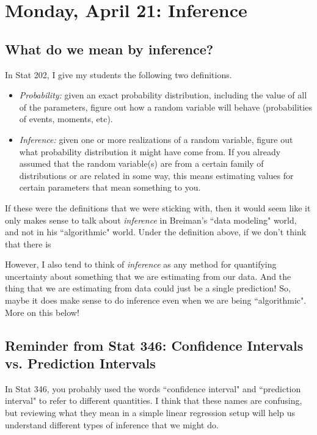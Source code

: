 \section{Monday, April 21: Inference}

\subsection{What do we mean by inference?}

In Stat 202, I give my students the following two definitions.
\begin{itemize}
\item \emph{Probability:} given an exact probability distribution, including the value of all of the parameters, figure out how a random variable will behave (probabilities of events, moments, etc).	
\item \emph{Inference:} given one or more realizations of a random variable, figure out what probability distribution it might have come from. If you already assumed that the random variable(s) are from a certain family of distributions or are related in some way, this means estimating values for certain parameters that mean something to you.  
\end{itemize}

If these were the definitions that we were sticking with, then it would seem like it only makes sense to talk about \emph{inference} in Breiman's ``data modeling" world, and not in his ``algorithmic" world. Under the definition above, if we don't think that there is 

However, I also tend to think of \emph{inference} as any method for quantifying uncertainty about something that we are estimating from our data. And the thing that we are estimating from data could just be a single prediction! So, maybe it does make sense to do inference even when we are being ``algorithmic". More on this below! 

\subsection{Reminder from Stat 346: Confidence Intervals vs. Prediction Intervals}

In Stat 346, you probably used the words ``confidence interval" and ``prediction interval" to refer to different quantities. I think that these names are confusing, but reviewing what they mean in a simple linear regression setup will help us understand different types of inference that we might do. 

